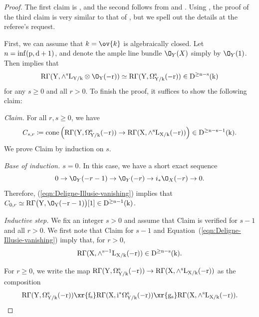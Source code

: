 \documentclass[11pt,reqno]{amsart}
\numberwithin{equation}{section}
\theoremstyle{definition}
\begin{document}
\begin{proof}
    The first claim is \cite[Prop.~5.3]{ABM}, and the second follows from \cite[Ex.~5.6]{ABM} and \cite[Prop.~5.7]{ABM}. Using \cite[Cor.~2.8]{Deligne-Illusie}, the proof of the third claim is very similar to that of \cite[Prop.~5.7]{ABM}, but we spell out the details at the referee's request. \smallskip
    
    First, we can assume that $k=\ov{k}$ is algebraically closed. Let $n = \rm{inf}(p, d+1)$, and denote the ample line bundle $\O_Y(X)$ simply by $\O_Y(1)$. Then \cite[Cor.~2.8]{Deligne-Illusie} implies that
    \begin{equation}\label{eqn:Deligne-Illusie-vanishing}
        \rm{R}\Gamma(Y, \wedge^s L_{Y/k} \otimes \O_Y(-r)) \simeq \rm{R}\Gamma(Y, \Omega^s_{Y/k}(-r)) \in D^{\geq n-s}(k)
    \end{equation}
    for any $s\geq 0$ and all $r>0$. To finish the proof, it suffices to show the following claim: \smallskip
    
    {\it Claim.} For all $r, s\geq 0$, we have
    \begin{equation}\label{eqn:claim}
        C_{s, r} \coloneqq \rm{cone}\left( \rm{R}\Gamma(Y, \Omega^s_{Y/k}(-r)) \to \rm{R}\Gamma(X, \wedge^s L_{X/k}(-r))\right) \in D^{\geq n-s-1}(k).
    \end{equation}
    We prove Claim by induction on $s$.\smallskip
    
    {\it Base of induction. $s=0$.} In this case, we have a short exact sequence
    \begin{equation}\label{eqn:divisor-ses}
    0\to \O_Y(-r-1) \to \O_Y(-r) \to i_*\O_X(-r) \to 0. 
    \end{equation}
    Therefore, (\ref{eqn:Deligne-Illusie-vanishing}) implies that $C_{0, r} \simeq \rm{R}\Gamma\big(Y, \O_Y(-r-1)\big)[1] \in D^{\geq n-1}(k)$.\smallskip
    
    {\it Inductive step.} We fix an integer $s>0$ and assume that Claim is verified for $s-1$ and all $r> 0$. We first note that Claim for $s-1$ and Equation~(\ref{eqn:Deligne-Illusie-vanishing}) imply that, for $r>0$,
    \begin{equation}\label{eqn:induction-step}
    \rm{R}\Gamma(X, \wedge^{s-1} L_{X/k}(-r)) \in D^{\geq n-s}(k).
    \end{equation}

    For $r\geq 0$, we write the map $\rm{R}\Gamma(Y, \Omega^s_{Y/k}(-r)) \to \rm{R}\Gamma(X, \wedge^s L_{X/k}(-r))$ as the composition
    \[
    \rm{R}\Gamma(Y, \Omega^s_{Y/k}(-r)) \xr{f_s} \rm{R}\Gamma(X, i^*\Omega^s_{Y/k}(-r)) \xr{g_s} \rm{R}\Gamma(X, \wedge^s L_{X/k}(-r)).
    \]
    

\end{proof}
\end{document}
